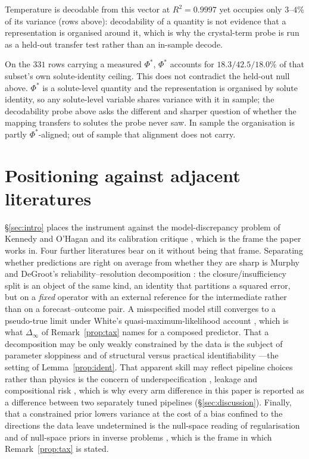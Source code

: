Temperature is decodable from this vector at $R^{2}=0.9997$ yet occupies only $3$--$4\%$ of its
variance (rows above): decodability of a quantity is not evidence that a representation is organised
around it, which is why the crystal-term probe is run as a held-out transfer test rather than an
in-sample decode.

On the $331$ rows carrying a measured $\Phi^{*}$, $\Phi^{*}$ accounts for $18.3/42.5/18.0\%$ of
that subset's own solute-identity ceiling. This does not contradict the held-out null above.
$\Phi^{*}$ is a solute-level quantity and the representation is organised by solute identity, so
any solute-level variable shares variance with it in sample; the decodability probe above asks the different and
sharper question of whether the mapping transfers to solutes the probe never saw. In sample the
organisation is partly $\Phi^{*}$-aligned; out of sample that alignment does not carry.



\section{Positioning against adjacent literatures}
\label{sec:si-positioning}
\S\ref{sec:intro} places the instrument against the model-discrepancy problem of Kennedy and
O'Hagan \cite{kennedy2001} and its calibration critique \cite{brynjarsdottir2014}, which is the
frame the paper works in. Four further literatures bear on it without being that frame.
Separating whether predictions are right on average from whether
they are sharp is Murphy and DeGroot's reliability--resolution decomposition
\cite{murphy1973,degroot1983}: the closure/insufficiency split is an object of the same kind, an
identity that partitions a squared error, but on a \emph{fixed} operator with an external reference
for the intermediate rather than on a forecast--outcome pair. A misspecified model still converges
to a pseudo-true limit under White's quasi-maximum-likelihood account \cite{white1982}, which is
what $\Delta_\infty$ of Remark~\ref{prop:tax} names for a composed predictor. That a
decomposition may be only weakly constrained by the data is the subject of parameter sloppiness
\cite{transtrum2015,gutenkunst2007} and of structural versus practical identifiability
\cite{raue2009,villaverde2016}---the setting of Lemma~\ref{prop:ident}. That apparent skill may
reflect pipeline choices rather than physics is the concern of underspecification
\cite{damour2022}, leakage \cite{kapoor2023} and compositional risk \cite{mahajan2025crm}, which is
why every arm difference in this paper is reported as a difference between two separately tuned
pipelines (\S\ref{sec:discussion}). Finally, that a constrained prior lowers variance at the cost of a
bias confined to the directions the data leave undetermined is the null-space reading of
regularisation \cite{engl1996,hansen1998} and of null-space priors in inverse problems
\cite{schwab2019}, which is the frame in which Remark~\ref{prop:tax} is stated.


